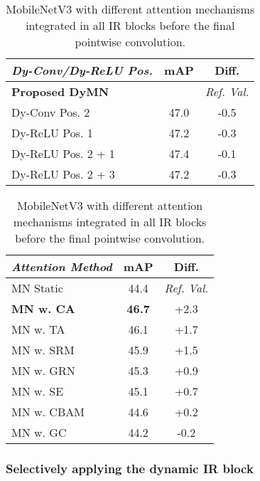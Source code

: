 \documentclass[lettersize,journal]{IEEEtran}
\begin{document}
\begin{table}[t!]

\centering
\begin{minipage}[t]{\columnwidth}
\caption{Effect of varying the position of Dy-ReLU and Dy-Convs in the dynamic IR block.}
\label{tab:abl_dyrelu_dyconv_pos}

\centering
\begin{tabular}{@{}lcc@{}}
\toprule
\textit{Dy-Conv/Dy-ReLU Pos.} & \textbf{mAP} & \textbf{Diff.}  \\ \midrule
\textbf{Proposed DyMN} &  & \textit{Ref. Val.} \\
\midrule
Dy-Conv Pos. 2 & 47.0 & -0.5  \\ \midrule
Dy-ReLU Pos. 1 & 47.2 & -0.3 \\ 
Dy-ReLU Pos. 2 + 1 & 47.4 & -0.1  \\ 
Dy-ReLU Pos. 2 + 3 & 47.2 &  -0.3 \\ 
 \bottomrule
\end{tabular}
\end{minipage}

\bigskip

\centering
\begin{minipage}[t]{\columnwidth}
\caption{MobileNetV3 with different attention mechanisms integrated in all IR blocks before the final pointwise convolution.} 
\label{tab:abl_cnn_att}

\centering
\begin{tabular}{lcc}
\toprule
\textit{Attention Method}
 & \textbf{mAP}
 & \textbf{Diff.} \\ 
\midrule
MN Static & 44.4  & \textit{Ref. Val.} \\
\midrule
\textbf{MN w. CA} & \textbf{46.7} & +2.3 \\
MN w. TA & 46.1 & +1.7 \\
MN w. SRM & 45.9 &  +1.5 \\
MN w. GRN & 45.3 & +0.9 \\
MN w. SE & 45.1  & +0.7 \\
MN w. CBAM & 44.6 & +0.2 \\
MN w. GC & 44.2 & -0.2 \\
\bottomrule
\end{tabular}
\end{minipage}

\end{table} 

\subsubsection{Selectively applying the dynamic IR block}
\end{document}
